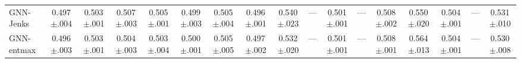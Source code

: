 \begin{table}[t]
{\begin{tabular}{lcccccccccccccccc}
GNN-Jenks & 0.497{\scriptsize$\pm$.004} & 0.503{\scriptsize$\pm$.001} & 0.507{\scriptsize$\pm$.003} & 0.505{\scriptsize$\pm$.001} & 0.499{\scriptsize$\pm$.003} & 0.505{\scriptsize$\pm$.004} & 0.496{\scriptsize$\pm$.001} & 0.540{\scriptsize$\pm$.023} & --- & 0.501{\scriptsize$\pm$.001} & --- & 0.508{\scriptsize$\pm$.002} & 0.550{\scriptsize$\pm$.020} & 0.504{\scriptsize$\pm$.001} & --- & 0.531{\scriptsize$\pm$.010} \\
GNN-entmax & 0.496{\scriptsize$\pm$.003} & 0.503{\scriptsize$\pm$.001} & 0.504{\scriptsize$\pm$.003} & 0.503{\scriptsize$\pm$.004} & 0.500{\scriptsize$\pm$.001} & 0.505{\scriptsize$\pm$.005} & 0.497{\scriptsize$\pm$.002} & 0.532{\scriptsize$\pm$.020} & --- & 0.501{\scriptsize$\pm$.001} & --- & 0.508{\scriptsize$\pm$.001} & 0.564{\scriptsize$\pm$.013} & 0.504{\scriptsize$\pm$.001} & --- & 0.530{\scriptsize$\pm$.008} \\
\bottomrule
\end{tabular}}
\end{table}
